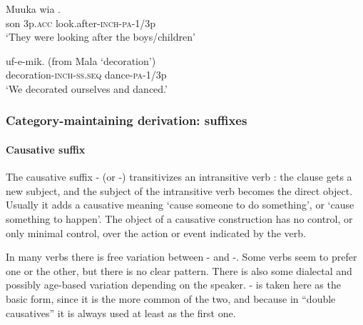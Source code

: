 \ea%
\label{ex:3:x487}
\gll Muuka wia .   \\
son 3p.\textsc{acc} look.after-\textsc{inch}-\textsc{pa}-1/3p\\
\glt`They were looking after the boys/children'
\z

\ea%
\label{ex:3:x488}
\gll {} uf-e-mik. (from Mala  `decoration') \\
decoration-\textsc{inch}-\textsc{ss}.\textsc{seq} dance-\textsc{pa}-1/3p\\
\glt`We decorated ourselves and danced.'
\z

\subsubsection{Category-maintaining derivation: suffixes}\label{sec:3:z:y:x}
{}
\paragraph{Causative suffix}\label{sec:3.8.2.3.1}
{}
The causative suffix \nobreakdash- (or \nobreakdash-) transitivizes an intransitive verb \citep[2]{Peterson2007}: the clause gets a new subject, and the subject of the intransitive verb becomes the direct object. Usually it adds a causative meaning `cause someone to do something', or `cause something to happen'. The object of a causative construction has no control, or only minimal control, over the action or event indicated by the verb.

In many verbs there is free variation between \nobreakdash- and \nobreakdash-. Some verbs seem to prefer one or the other, but there is no clear pattern. There is also some dialectal and possibly age-based variation depending on the speaker. \nobreakdash- is taken here as the basic form, since it is the more common of the two, and because in ``double causatives'' it is always used at least as the first one. 

